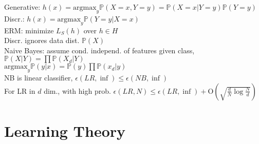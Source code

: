 Generative: $h(x) = \text{argmax}_y \mathbb{P}(X=x, Y=y) = \mathbb{P}(X=x|Y=y)\mathbb{P}(Y=y)$\\
Discr.: $h(x) = \text{argmax}_y \mathbb{P}(Y=y|X=x)$\\
ERM: minimize $L_S(h)$ over $h \in H$\\
Discr. ignores data dist. $\mathbb{P}(X)$\\
Naive Bayes: assume cond. independ. of features given class, $\mathbb{P}(X|Y) = \prod \mathbb{P}(X_d|Y)$\\
$\text{argmax}_y \mathbb{P}(y|x) = \mathbb{P}(y) \prod \mathbb{P}(x_d|y)$\\
NB is linear classifier, $\epsilon(LR, \inf) \leq \epsilon(NB, \inf)$\\
For LR in $d$ dim., with high prob. $\epsilon(LR, N) \leq \epsilon(LR, \inf) + \text{O}(\sqrt{\frac{d}{N}\log\frac{N}{d}})$

\section{Learning Theory}

